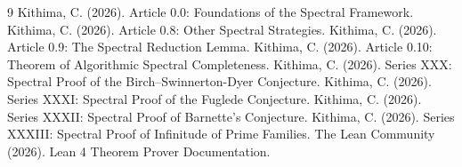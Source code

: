 \documentclass[11pt,a4paper]{article}
\begin{document}

\begin{thebibliography}{9}
  Kithima, C. (2026). Article 0.0: Foundations of the Spectral Framework.
  Kithima, C. (2026). Article 0.8: Other Spectral Strategies.
  Kithima, C. (2026). Article 0.9: The Spectral Reduction Lemma.
  Kithima, C. (2026). Article 0.10: Theorem of Algorithmic Spectral Completeness.
  Kithima, C. (2026). Series XXX: Spectral Proof of the Birch–Swinnerton-Dyer Conjecture.
  Kithima, C. (2026). Series XXXI: Spectral Proof of the Fuglede Conjecture.
  Kithima, C. (2026). Series XXXII: Spectral Proof of Barnette's Conjecture.
  Kithima, C. (2026). Series XXXIII: Spectral Proof of Infinitude of Prime Families.
  The Lean Community (2026). Lean 4 Theorem Prover Documentation.
\end{thebibliography}
\end{document}

